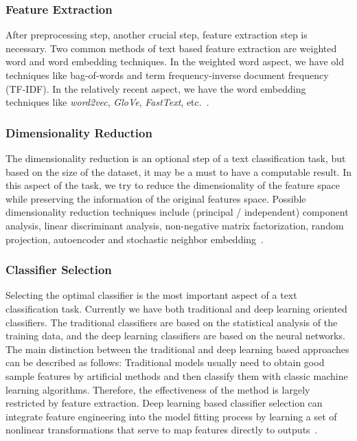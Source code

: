 \subsubsection{Feature Extraction}
After preprocessing step, another crucial step, feature extraction step is necessary. Two common methods of text based feature extraction are weighted word and word embedding techniques. In the weighted word aspect, we have old techniques like bag-of-words and term frequency-inverse document frequency (TF-IDF). In the relatively recent aspect, we have the word embedding techniques like \emph{word2vec}, \emph{GloVe}, \emph{FastText}, etc.~\autocite{kowsari19tc}.

\subsubsection{Dimensionality Reduction}
The dimensionality reduction is an optional step of a text classification task, but based on the size of the dataset, it may be a must to have a computable result. In this aspect of the task, we try to reduce the dimensionality of the feature space while preserving the information of the original features space. Possible dimensionality reduction techniques include (principal / independent) component analysis, linear discriminant analysis, non-negative matrix factorization, random projection, autoencoder and stochastic neighbor embedding~\autocite{kowsari19tc}.

\subsubsection{Classifier Selection}
Selecting the optimal classifier is the most important aspect of a text classification task. Currently we have both traditional and deep learning oriented classifiers. The traditional classifiers are based on the statistical analysis of the training data, and the deep learning classifiers are based on the neural networks. The main distinction between the traditional and deep learning based approaches can be described as follows: Traditional models usually need to obtain good sample features by artificial methods and then classify them with classic machine learning algorithms. Therefore, the effectiveness of the method is largely restricted by feature extraction. Deep learning based classifier selection can integrate feature engineering into the model fitting process by learning a set of nonlinear transformations that serve to map features directly to outputs~\autocite{li20tc}.

